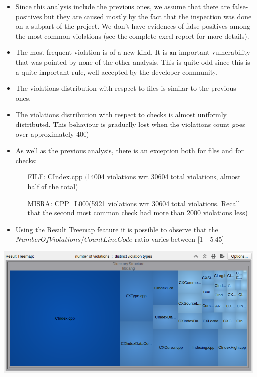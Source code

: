\begin{itemize}
	\item Since this analysis include the previous ones, we assume that there are false-positives but they are caused mostly by the fact that the inspection was done on a subpart of the project. We don't have evidences of false-positives among the most common violations (see the complete excel report for more details).
	\item The most frequent violation is of a new kind. It is an important vulnerability that was pointed by none of the other analysis. This is quite odd since this is a quite important rule, well accepted by the developer community.
	\item The violations distribution with respect to files is similar to the previous ones.
	\item The violations distribution with respect to checks is almost uniformly distributed. This behaviour is gradually lost when the violations count goes over approximately 400)
	\item As well as the previous analysis, there is an exception both for files and for checks:
	\begin{itemize}
		\item[FILE: ] CIndex.cpp (14004 violations wrt 30604 total violations, almost half of the total)
		\item[MISRA: ] CPP\_L000(5921 violations wrt 30604 total violations. Recall that the second most common check had more than 2000 violations less)
	\end{itemize}
	\item Using the Result Treemap feature it is possible to observe that the $NumberOfViolations/CountLineCode$ ratio varies between [1 - 5.45]
\end{itemize}

\begin{minipage}{\linewidth}
	\includegraphics[width=\textwidth]{img/AllChecksTreeMap.png}
\end{minipage}

